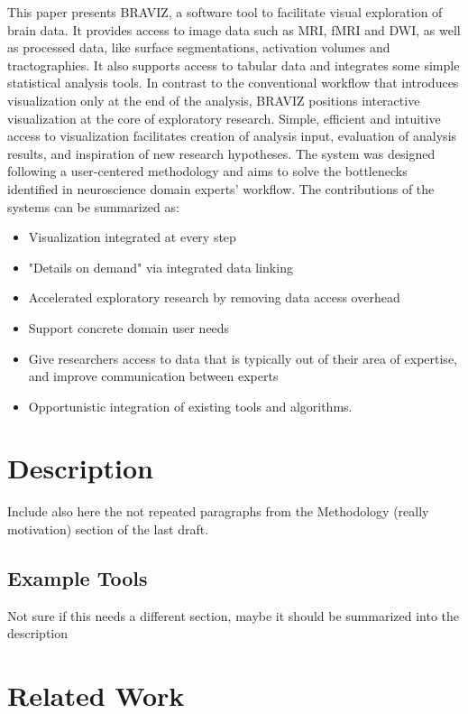 \documentclass{frontiersSCNS} %
\begin{document}
This paper presents BRAVIZ, a software tool to facilitate visual exploration of brain data. It provides access to image data such as MRI, fMRI and DWI, as well as processed data, like surface segmentations, activation volumes and tractographies. It also supports access to tabular data and integrates some simple statistical analysis tools. In contrast to the conventional workflow that introduces visualization only at the end of the analysis, BRAVIZ positions interactive visualization at the core of exploratory research. Simple, efficient and intuitive access to visualization facilitates creation of analysis input, evaluation of analysis results, and inspiration of new research hypotheses. The system was designed following a user-centered methodology and aims to solve the bottlenecks identified in neuroscience domain experts’ workflow. The contributions of the systems can be summarized as:
\begin{itemize}
\item Visualization integrated at every step
\item "Details on demand" via integrated data linking 
\item Accelerated exploratory research by removing data access overhead
\item Support concrete domain user needs
\item Give researchers access to data that is typically out of their area of expertise, and improve communication between experts
\item Opportunistic integration of existing tools and algorithms.

\end{itemize}

\section{Description}

Include also here the not repeated paragraphs from the Methodology (really motivation) section of the last draft.

\subsection{Example Tools}

Not sure if this needs a different section, maybe it should be summarized into the description

\section{Related Work}
\end{document}
